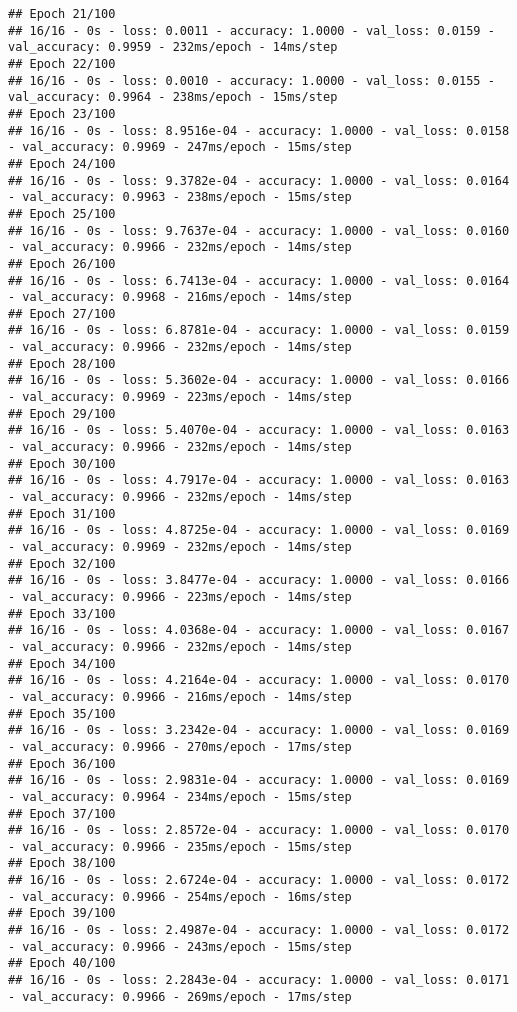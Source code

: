 \documentclass[
]{article}
\begin{document}
\begin{verbatim}
## Epoch 21/100
## 16/16 - 0s - loss: 0.0011 - accuracy: 1.0000 - val_loss: 0.0159 - val_accuracy: 0.9959 - 232ms/epoch - 14ms/step
## Epoch 22/100
## 16/16 - 0s - loss: 0.0010 - accuracy: 1.0000 - val_loss: 0.0155 - val_accuracy: 0.9964 - 238ms/epoch - 15ms/step
## Epoch 23/100
## 16/16 - 0s - loss: 8.9516e-04 - accuracy: 1.0000 - val_loss: 0.0158 - val_accuracy: 0.9969 - 247ms/epoch - 15ms/step
## Epoch 24/100
## 16/16 - 0s - loss: 9.3782e-04 - accuracy: 1.0000 - val_loss: 0.0164 - val_accuracy: 0.9963 - 238ms/epoch - 15ms/step
## Epoch 25/100
## 16/16 - 0s - loss: 9.7637e-04 - accuracy: 1.0000 - val_loss: 0.0160 - val_accuracy: 0.9966 - 232ms/epoch - 14ms/step
## Epoch 26/100
## 16/16 - 0s - loss: 6.7413e-04 - accuracy: 1.0000 - val_loss: 0.0164 - val_accuracy: 0.9968 - 216ms/epoch - 14ms/step
## Epoch 27/100
## 16/16 - 0s - loss: 6.8781e-04 - accuracy: 1.0000 - val_loss: 0.0159 - val_accuracy: 0.9966 - 232ms/epoch - 14ms/step
## Epoch 28/100
## 16/16 - 0s - loss: 5.3602e-04 - accuracy: 1.0000 - val_loss: 0.0166 - val_accuracy: 0.9969 - 223ms/epoch - 14ms/step
## Epoch 29/100
## 16/16 - 0s - loss: 5.4070e-04 - accuracy: 1.0000 - val_loss: 0.0163 - val_accuracy: 0.9966 - 232ms/epoch - 14ms/step
## Epoch 30/100
## 16/16 - 0s - loss: 4.7917e-04 - accuracy: 1.0000 - val_loss: 0.0163 - val_accuracy: 0.9966 - 232ms/epoch - 14ms/step
## Epoch 31/100
## 16/16 - 0s - loss: 4.8725e-04 - accuracy: 1.0000 - val_loss: 0.0169 - val_accuracy: 0.9969 - 232ms/epoch - 14ms/step
## Epoch 32/100
## 16/16 - 0s - loss: 3.8477e-04 - accuracy: 1.0000 - val_loss: 0.0166 - val_accuracy: 0.9966 - 223ms/epoch - 14ms/step
## Epoch 33/100
## 16/16 - 0s - loss: 4.0368e-04 - accuracy: 1.0000 - val_loss: 0.0167 - val_accuracy: 0.9966 - 232ms/epoch - 14ms/step
## Epoch 34/100
## 16/16 - 0s - loss: 4.2164e-04 - accuracy: 1.0000 - val_loss: 0.0170 - val_accuracy: 0.9966 - 216ms/epoch - 14ms/step
## Epoch 35/100
## 16/16 - 0s - loss: 3.2342e-04 - accuracy: 1.0000 - val_loss: 0.0169 - val_accuracy: 0.9966 - 270ms/epoch - 17ms/step
## Epoch 36/100
## 16/16 - 0s - loss: 2.9831e-04 - accuracy: 1.0000 - val_loss: 0.0169 - val_accuracy: 0.9964 - 234ms/epoch - 15ms/step
## Epoch 37/100
## 16/16 - 0s - loss: 2.8572e-04 - accuracy: 1.0000 - val_loss: 0.0170 - val_accuracy: 0.9966 - 235ms/epoch - 15ms/step
## Epoch 38/100
## 16/16 - 0s - loss: 2.6724e-04 - accuracy: 1.0000 - val_loss: 0.0172 - val_accuracy: 0.9966 - 254ms/epoch - 16ms/step
## Epoch 39/100
## 16/16 - 0s - loss: 2.4987e-04 - accuracy: 1.0000 - val_loss: 0.0172 - val_accuracy: 0.9966 - 243ms/epoch - 15ms/step
## Epoch 40/100
## 16/16 - 0s - loss: 2.2843e-04 - accuracy: 1.0000 - val_loss: 0.0171 - val_accuracy: 0.9966 - 269ms/epoch - 17ms/step

\end{verbatim}
\end{document}
